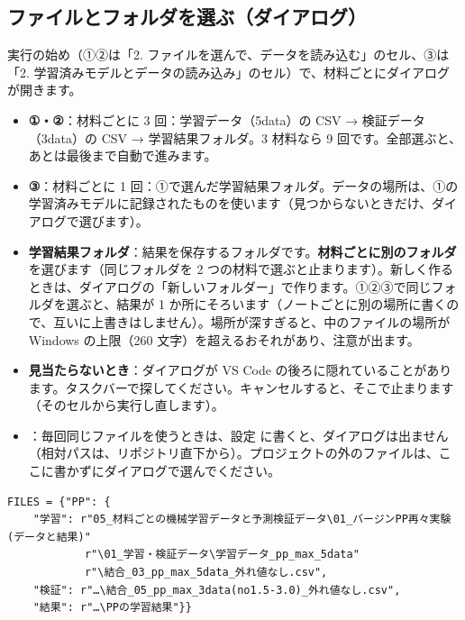 \documentclass[paper=a4paper,fontsize=10.5pt,line_length=44zw,number_of_lines=38]{jlreq}
\newcommand{\file}[1]{\texttt{\detokenize{#1}}}
\newenvironment{points}{\begin{itemize}[label=$\triangleright$,leftmargin=1.5\zw,itemsep=0.3ex,topsep=0.5ex,parsep=0pt]}{\end{itemize}}
\newcommand{\pt}[1]{\item \textbf{#1}：}
\begin{document}
\subsection{ファイルとフォルダを選ぶ（ダイアログ）}
実行の始め（①②は「2. ファイルを選んで、データを読み込む」のセル、③は「2. 学習済みモデルとデータの読み込み」のセル）で、材料ごとにダイアログが開きます。
\begin{points}
\pt{①・②}材料ごとに 3 回：学習データ（5data）の CSV → 検証データ（3data）の CSV → 学習結果フォルダ。3 材料なら 9 回です。全部選ぶと、あとは最後まで自動で進みます。
\pt{③}材料ごとに 1 回：①で選んだ学習結果フォルダ。データの場所は、①の学習済みモデルに記録されたものを使います（見つからないときだけ、ダイアログで選びます）。
\pt{学習結果フォルダ}結果を保存するフォルダです。\textbf{材料ごとに別のフォルダ}を選びます（同じフォルダを 2 つの材料で選ぶと止まります）。新しく作るときは、ダイアログの「新しいフォルダー」で作ります。①②③で同じフォルダを選ぶと、結果が 1 か所にそろいます（ノートごとに別の場所に書くので、互いに上書きはしません）。場所が深すぎると、中のファイルの場所が Windows の上限（260 文字）を超えるおそれがあり、注意が出ます。
\pt{見当たらないとき}ダイアログが VS Code の後ろに隠れていることがあります。タスクバーで探してください。キャンセルすると、そこで止まります（そのセルから実行し直します）。
\pt{\file{FILES}}毎回同じファイルを使うときは、設定 \file{FILES} に書くと、ダイアログは出ません（相対パスは、リポジトリ直下から）。プロジェクトの外のファイルは、ここに書かずにダイアログで選んでください。
\end{points}
\begin{Verbatim}[frame=single,fontsize=\small,xleftmargin=1em]
FILES = {"PP": {
    "学習": r"05_材料ごとの機械学習データと予測検証データ\01_バージンPP再々実験(データと結果)"
            r"\01_学習・検証データ\学習データ_pp_max_5data"
            r"\結合_03_pp_max_5data_外れ値なし.csv",
    "検証": r"…\結合_05_pp_max_3data(no1.5-3.0)_外れ値なし.csv",
    "結果": r"…\PPの学習結果"}}
\end{Verbatim}
\end{document}
